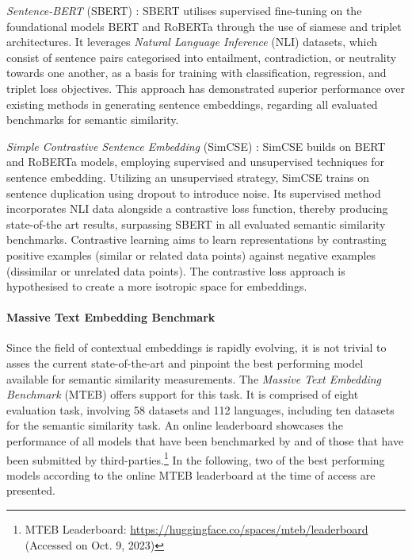 \documentclass[11pt]{scrreprt}
\let\citef\cite  %
\let\cite\parencite  %
\begin{document}
\textit{Sentence-BERT} (SBERT) \cite{reimersSentenceBERTSentenceEmbeddings2019}: SBERT utilises supervised fine-tuning on the foundational models BERT and RoBERTa through the use of siamese and triplet architectures. It leverages \textit{Natural Language Inference} (NLI) datasets, which consist of sentence pairs categorised into entailment, contradiction, or neutrality towards one another, as a basis for training with classification, regression, and triplet loss objectives. This approach has demonstrated superior performance over existing methods in generating sentence embeddings, regarding all evaluated benchmarks for semantic similarity. 

\textit{Simple Contrastive Sentence Embedding} (SimCSE) \cite{gaoSimCSESimpleContrastive2021}:
 SimCSE builds on BERT and RoBERTa models, employing supervised and unsupervised techniques for sentence embedding. Utilizing an unsupervised strategy, SimCSE trains on sentence duplication using dropout to introduce noise. Its supervised method incorporates NLI data alongside a contrastive loss function, thereby producing state-of-the art results, surpassing SBERT in all evaluated semantic similarity benchmarks. Contrastive learning aims to learn representations by contrasting positive examples (similar or related data points) against negative examples (dissimilar or unrelated data points). The contrastive loss approach is hypothesised to create a more isotropic space for embeddings.

\paragraph{Massive Text Embedding Benchmark}
Since the field of contextual embeddings is rapidly evolving, it is not trivial to asses the current state-of-the-art and pinpoint the best performing model available for semantic similarity measurements.
The \textit{Massive Text Embedding Benchmark} (MTEB) \cite{muennighoffMTEBMassiveText2023} offers support for this task. It is comprised of eight evaluation task, involving 58 datasets and 112 languages, including ten datasets for the semantic similarity task. An online leaderboard showcases the performance of all models that have been benchmarked by \citef{muennighoffMTEBMassiveText2023} and of those that have been submitted by third-parties.\footnote{MTEB Leaderboard: \url{https://huggingface.co/spaces/mteb/leaderboard} (Accessed on Oct. 9, 2023)} In the following, two of the best performing models according to the online MTEB leaderboard at the time of access are presented.
\end{document}
